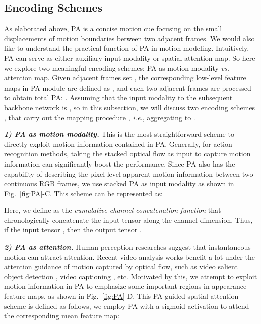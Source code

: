 \documentclass[journal]{IEEEtran}
\begin{document}
\subsection{Encoding Schemes} \label{section:encoding}



As elaborated above, PA is a concise motion cue focusing on the small displacements of motion boundaries between two adjacent frames. We would also like to understand the practical function of PA in motion modeling. Intuitively, PA can serve as either auxiliary input modality or spatial attention map. So here we explore two meaningful encoding schemes: PA as motion modality \emph{vs.} attention map. Given  adjacent frames set , the corresponding low-level feature maps in PA module are defined as , and each two adjacent frames are processed to obtain total  PA: . Assuming that the input modality to the subsequent backbone network is , so in this subsection, we will discuss two encoding schemes ,  that carry out the mapping procedure , \emph{i.e.}, aggregating  to .



\textbf{\emph{1) PA as motion modality.}} This is the most straightforward scheme to directly exploit motion information contained in PA. Generally, for action recognition methods, taking the stacked optical flow as input to capture motion information can significantly boost the performance. Since PA also has the capability of describing the pixel-level apparent motion information between two continuous RGB frames, we use stacked PA as input modality as shown in Fig.~\ref{fig:PA}-C. This scheme can be represented as:



Here, we define  as the \emph{cumulative channel concatenation function} that chronologically concatenate the input tensor along the channel dimension. Thus, if the input tensor , then the output tensor .


\textbf{\emph{2) PA as attention.}} Human perception researches \cite{howard2010unexpected,itti2006bayesian} suggest that instantaneous motion can attract attention. Recent video analysis works benefit a lot under the attention guidance of motion captured by optical flow, such as video salient object detection \cite{li2019motion}, video captioning \cite{chen2019motion}, etc. Motivated by this, we attempt to exploit motion information in PA to emphasize some important regions in appearance feature maps, as shown in Fig.~\ref{fig:PA}-D. This PA-guided spatial attention scheme is defined as follows, we employ PA with a sigmoid activation to attend the corresponding mean feature map:
\end{document}
